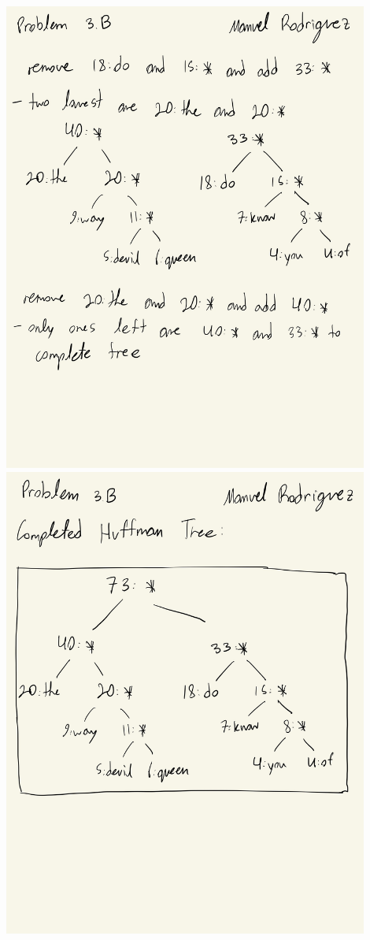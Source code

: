 \begin{solution}
	\\ \includegraphics[width=12cm]{plots/CS 155 PS5-4.jpg}
	\\ \includegraphics[width=12cm]{plots/CS 155 PS5-5.jpg}

\end{solution}
